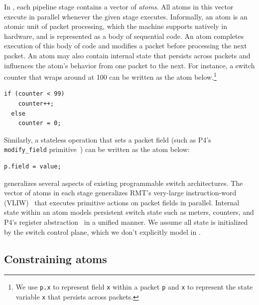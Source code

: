 In \absmachine, each pipeline stage contains a vector of \textit{atoms}. All
atoms in this vector execute in parallel whenever the given stage executes.
Informally, an atom is an atomic unit of packet processing, which the
\absmachine machine supports natively in hardware, and is represented as a body
of sequential code. An atom completes execution of this body of code and
modifies a packet before processing the next packet.  An atom
may also contain internal state that persists across packets and influences the
atom's behavior from one packet to the next.  For instance, a switch counter that
wraps around at 100 can be written as the atom below.\footnote{We use {\tt p.x} to represent
  field {\tt x} within a packet {\tt p} and {\tt x} to represent the state
variable {\tt x} that persists across packets.}
  \begin{lstlisting}[style=customc, numbers=none, frame=none]
  if (counter < 99)
    counter++;
  else
    counter = 0;
  \end{lstlisting}
Similarly, a stateless operation that sets a packet field (such as P4's {\tt
modify\_field} primitive~\cite{p4spec}) can be written as the atom below:
\begin{lstlisting}[style=customc, numbers=none, frame=none]
  p.field = value;
\end{lstlisting}


\absmachine generalizes several aspects of existing programmable switch
architectures. The vector of atoms in each stage generalizes RMT's very-large
instruction-word (VLIW)~\cite{rmt} that executes primitive actions on packet
fields in parallel. Internal state within an atom models persistent switch
state such as meters, counters, and P4's register abstraction~\cite{p4spec} in
a unified manner. We assume all state is initialized by the switch control
plane, which we don't explicitly model in \absmachine.

\subsection{Constraining atoms}
\label{s:atomConstraints}

